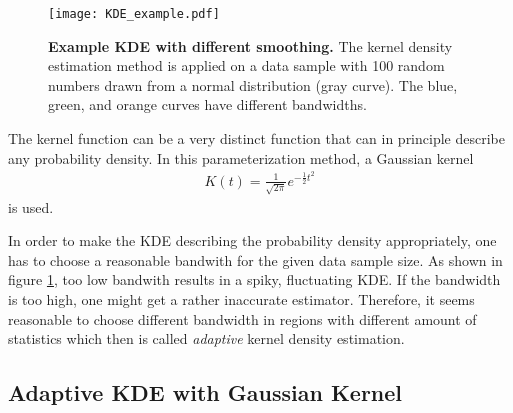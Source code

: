 \begin{figure}[H]
	\centering
	\texttt{[image: KDE\_example.pdf]}
	\caption[Example KDE with different smoothing]{\textbf{Example KDE with different smoothing.} \cite{kde:example_plot} The kernel density estimation method is applied on a data sample with 100 random numbers drawn from a normal distribution (gray curve). The blue, green, and orange curves have different bandwidths.}
	\label{kde:example_1d}	
\end{figure}

The kernel function can be a very distinct function that can in principle describe any probability density. In this parameterization method, a Gaussian kernel
\begin{align}
	K(t) = \frac{1}{\sqrt{2\pi}}e^{-\frac{1}{2}t^2}
\end{align}
is used.

In order to make the KDE describing the probability density appropriately, one has to choose a reasonable bandwith for the given data sample size. As shown in figure \ref{kde:example_1d}, too low bandwith results in a spiky, fluctuating KDE. If the bandwidth is too high, one might get a rather inaccurate estimator. Therefore, it seems reasonable to choose different bandwidth in regions with different amount of statistics which then is called \textit{adaptive} kernel density estimation. \cite{kde:schoenen, kde:wangwang}

\subsection{Adaptive KDE with Gaussian Kernel}\label{sec:adaptive_kde}

